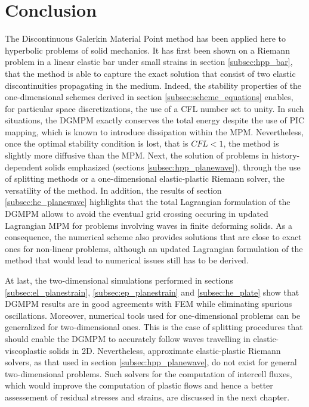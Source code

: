 \section{Conclusion}
The Discontinuous Galerkin Material Point method has been applied here to hyperbolic problems of solid mechanics.
It has first been shown on a Riemann problem in a linear elastic bar under small strains in section \ref{subsec:hpp_bar}, that the method is able to capture the exact solution that consist of two elastic discontinuities propagating in the medium.
Indeed, the stability properties of the one-dimensional schemes derived in section \ref{subsec:scheme_equations} enables, for particular space discretizations, the use of a CFL number set to unity.
In such situations, the DGMPM exactly conserves the total energy despite the use of PIC mapping, which is known to introduce dissipation within the MPM.
Nevertheless, once the optimal stability condition is lost, that is $CFL <1$, the method is slightly more diffusive than the MPM.
Next, the solution of problems in history-dependent solids emphasized (sections \ref{subsec:hpp_planewave}), through the use of splitting methods or a one-dimensional elastic-plastic Riemann solver, the versatility of the method.
In addition, the results of section \ref{subsec:he_planewave} highlights that the total Lagrangian formulation of the DGMPM allows to avoid the eventual grid crossing occuring in updated Lagrangian MPM for problems involving waves in finite deforming solids.
As a consequence, the numerical scheme also provides solutions that are close to exact ones for non-linear problems, although an updated Lagrangian formulation of the method that would lead to numerical issues still has to be derived. 

At last, the two-dimensional simulations performed in sections \ref{subsec:el_planestrain}, \ref{subsec:ep_planestrain} and \ref{subsec:he_plate} show that DGMPM results are in good agreements with FEM while eliminating spurious oscillations.
Moreover, numerical tools used for one-dimensional problems can be generalized for two-dimensional ones. This is the case of splitting procedures that should enable the DGMPM to accurately follow waves travelling in elastic-viscoplastic solids in 2D. Nevertheless, approximate elastic-plastic Riemann solvers, as that used in section \ref{subsec:hpp_planewave}, do not exist for general two-dimensional problems. Such solvers for the computation of intercell fluxes, which would improve the computation of plastic flows and hence a better assessement of residual stresses and strains, are discussed in the next chapter. 



